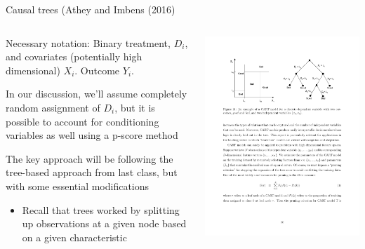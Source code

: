 \documentclass[notes,11pt, aspectratio=169]{beamer}
\newenvironment{wideitemize}{\itemize\addtolength{\itemsep}{10pt}}{\enditemize}
\begin{document}
\begin{frame}{Causal trees (Athey and Imbens (2016)}
    \begin{columns}[onlytextwidth, T] %
      \begin{column}{.5\textwidth}
        \begin{wideitemize}
        \item Necessary notation: Binary treatment, $D_{i}$, and covariates
          (potentially high dimensional) $X_{i}$. Outcome
          $Y_{i}$.
        \item In our discussion, we'll assume completely random assignment
          of $D_{i}$, but it is possible to account for conditioning
          variables as well using a p-score method 
        \item The key approach will be following the tree-based approach from last class, but with some essential modifications
          \begin{itemize}
          \item Recall that trees worked by splitting up observations at a
            given node based on a given characteristic
          \end{itemize}
        \end{wideitemize}
      \end{column}%
      \hfill%
      \begin{column}{.5\textwidth}
        \includegraphics[width=\linewidth]{images/Tree_Lo.pdf}
      \end{column}%
    \end{columns}
\end{frame}
\end{document}
